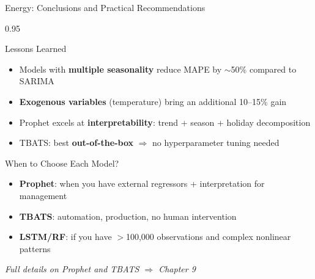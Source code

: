 \documentclass[9pt, aspectratio=169, t]{beamer}
\begin{document}
\begin{frame}{Energy: Conclusions and Practical Recommendations}
    \begin{cminipage}{0.95\textwidth}
    \begin{block}{Lessons Learned}
        \begin{itemize}\setlength{\itemsep}{0pt}
            \item Models with \textbf{multiple seasonality} reduce MAPE by $\sim$50\% compared to SARIMA
            \item \textbf{Exogenous variables} (temperature) bring an additional 10--15\% gain
            \item Prophet excels at \textbf{interpretability}: trend + season + holiday decomposition
            \item TBATS: best \textbf{out-of-the-box} $\Rightarrow$ no hyperparameter tuning needed
        \end{itemize}
    \end{block}
    \vspace{0.1cm}
    \begin{alertblock}{When to Choose Each Model?}
        \begin{itemize}\setlength{\itemsep}{0pt}
            \item \textbf{Prophet}: when you have external regressors + interpretation for management
            \item \textbf{TBATS}: automation, production, no human intervention
            \item \textbf{LSTM/RF}: if you have $>$100,000 observations and complex nonlinear patterns
        \end{itemize}
    \end{alertblock}
    {\footnotesize
    \begin{exampleblock}{}
        \textit{Full details on Prophet and TBATS $\Rightarrow$ Chapter 9}
    \end{exampleblock}
    }
    \end{cminipage}
\end{frame}
\end{document}
